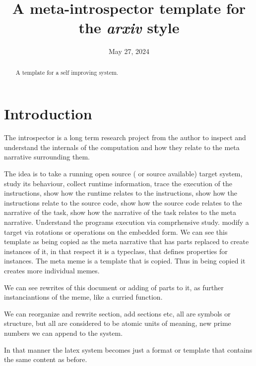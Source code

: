 \documentclass{article}
\title{A meta-introspector template for the \emph{arxiv} style}
\date{May 27, 2024}
\author{ \href{https://github.com/meta-introspector/time/blob/main/authors/james-michael-dupont.org}{\texttt{[image: metaintrospector-icon.png]}\hspace{1mm}Mike DuPont}\thanks
	Author\\
	Meta Introspector\\
	\texttt{jmikedupont2@gmail.com} \\
}
\author[1]{%
  \author{ \href{https://github.com/meta-introspector/time/blob/main/authors/james-michael-dupont.org}{\texttt{[image: metaintrospector-icon.png]}\hspace{1mm}Mike DuPont}\thanks\texttt{jmikedupont2@gmail.com}}}%
\affil[1]{Author, Meta Introspector}
\begin{document}
\maketitle

\begin{abstract}
	A template for a self improving system.
\end{abstract}



\section{Introduction}

The introspector is a long term research project from the author to inspect and understand the internals of the computation and how they relate to the meta narrative surrounding them.

The idea is to take a running open source ( or source available) target system,
study its behaviour, collect runtime information,
trace the execution of the instructions,
show how the runtime relates to the instructions,
show how the instructions relate to the source code,
show how the source code relates to the narrative of the task,
show how the narrative of the task relates to the meta narrative.
Understand the programs execution via comprhensive study.
modify a target via rotations or operations on the embedded form.
We can see this template as being copied as the meta narrative that
has parts replaced to create instances of it,
in that respect it is a typeclass, that defines properties
for instances. The meta meme is a template that is copied.
Thus in being copied it creates more individual memes.

We can see rewrites of this document
or adding of parts to it, as further instanciantions of the meme, like a curried function.

We can reorganize and rewrite section,
add sections etc, all are symbols or structure, but all are considered to be atomic units of meaning, new prime numbers we can append to the system.

In that manner the latex system becomes
just a format or template that contains the same content as before.
\end{document}
